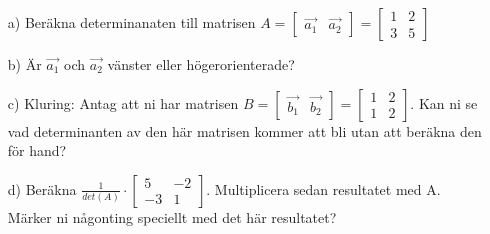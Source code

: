 \begin{itemize}
	\item[a) ] Beräkna determinanaten till matrisen $A = \begin{bmatrix} \vec{a_1} & \vec{a_2}\end{bmatrix} =\begin{bmatrix}1 & 2 \\ 3 & 5\end{bmatrix}$
	\item[b) ] Är $\vec{a_1}$ och $\vec{a_2}$ vänster eller högerorienterade?
	\item[c) ] Kluring: Antag att ni har matrisen $B = \begin{bmatrix} \vec{b_1} & \vec{b_2}\end{bmatrix} =\begin{bmatrix}1 & 2 \\ 1 & 2\end{bmatrix}$. Kan ni se vad determinanten av den här matrisen kommer att bli utan att beräkna den för hand?
	\item[d) ] Beräkna $\frac{1}{det(A)} \cdot \begin{bmatrix}5 & -2 \\ -3 & 1\end{bmatrix}$. Multiplicera sedan resultatet med A. Märker ni någonting speciellt med det här resultatet?
\end{itemize}